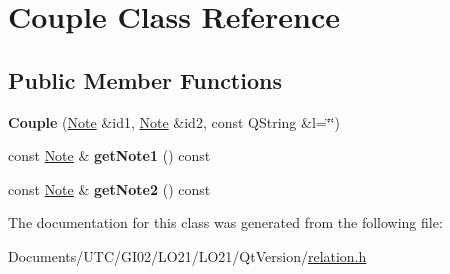 \hypertarget{class_couple}{}\section{Couple Class Reference}
\label{class_couple}
\subsection*{Public Member Functions}
\begin{DoxyCompactItemize}
\item 
\mbox{\label{class_couple_a0000c961b867947f39e76a6f0ea04527}} 
{\bfseries Couple} (\hyperlink{class_note}{Note} \&id1, \hyperlink{class_note}{Note} \&id2, const Q\+String \&l=\char`\"{}\char`\"{})
\item 
\mbox{\label{class_couple_ab1e111ccd47d953bce5a485a40f6e7d2}} 
const \hyperlink{class_note}{Note} \& {\bfseries get\+Note1} () const
\item 
\mbox{\label{class_couple_ad3d28199ad0170f65c4564a910167ed6}} 
const \hyperlink{class_note}{Note} \& {\bfseries get\+Note2} () const
\end{DoxyCompactItemize}


The documentation for this class was generated from the following file\+:\begin{DoxyCompactItemize}
\item 
Documents/\+U\+T\+C/\+G\+I02/\+L\+O21/\+L\+O21/\+Qt\+Version/\hyperlink{relation_8h}{relation.\+h}\end{DoxyCompactItemize}
